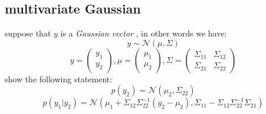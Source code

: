 \subsection{multivariate Gaussian} 
suppose that $y$ is a \textit{Gaussian vector} , in other words we have:
$$y \sim \mathcal{N}(\mu, \Sigma)$$
$$y = \begin{pmatrix} y_1 \\ y_2 \end{pmatrix} , \mu = \begin{pmatrix} \mu_1 \\ \mu_2 \end{pmatrix} , \Sigma = \begin{pmatrix} \Sigma_{11} & \Sigma_{12} \\ \Sigma_{21} & \Sigma_{22} \end{pmatrix}$$
show the following statement:
$$p(y_2) = \mathcal{N} (\mu_2 , \Sigma_{22})$$
$$p(y_1|y_2) = \mathcal{N} (\mu_1 + \Sigma_{12}\Sigma_{22}^{-1}(y_2 - \mu_2), \Sigma_{11} - \Sigma_{12}\Sigma_{22}^{-1}\Sigma_{21})$$
